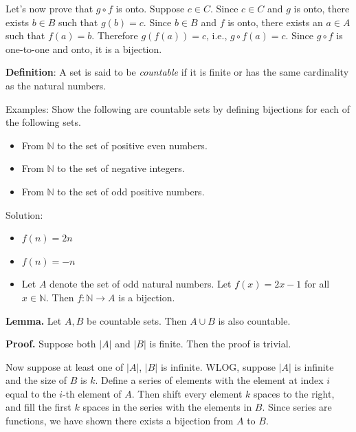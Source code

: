\documentclass{article}
\begin{document}
    \qquad Let’s now prove that $g \circ f$ is onto. Suppose $c \in C$. Since $c \in C$ and $g$ is onto, there exists $b \in B$ such that $g(b) = c$. Since $b \in B$ and $f$ is onto, there exists an $a \in A$ such that $f(a) = b$. Therefore $g(f(a)) = c$, i.e., $g \circ f(a) = c$. Since $g \circ f$ is one-to-one and onto, it is a bijection.
    
    \vspace{3mm}
    \textbf{Definition}: A set is said to be \textit{countable} if it is finite or has the same cardinality as the natural numbers.

    Examples: 
    Show the following are countable sets by defining bijections for each of the following sets.
    
    \begin{itemize}
        \item From $\mathbb{N}$ to the set of positive even numbers.
        \item From $\mathbb{N}$ to the set of negative integers.
        \item From $\mathbb{N}$ to the set of odd positive numbers.
    \end{itemize}
    
    Solution:
    \begin{itemize}
        \item $f(n) = 2n$
        \item $f(n) = -n$
        \item Let $A$ denote the set of odd natural numbers. Let $f(x) = 2x - 1$ for all $x \in \mathbb{N}$. Then $f: \mathbb{N} \rightarrow A$ is a bijection.
    \end{itemize}
    
    
    \vspace{3mm}
    \textbf{Lemma.} Let $A, B$ be countable sets. Then $A \cup B$ is also countable.
    
    \vspace{1.5mm}
    \textbf{Proof.}
    Suppose both $|A|$ and $|B|$ is finite. Then the proof is trivial.
    
    Now suppose at least one of $|A|$, $|B|$ is infinite. WLOG, suppose $|A|$ is infinite and the size of $B$ is $k$. Define a series of elements with the element at index $i$ equal to the $i$-th element of $A$. Then shift every element $k$ spaces to the right, and fill the first $k$ spaces in the series with the elements in $B$. Since series are functions, we have shown there exists a bijection from $A$ to $B$.
    
\end{document}

